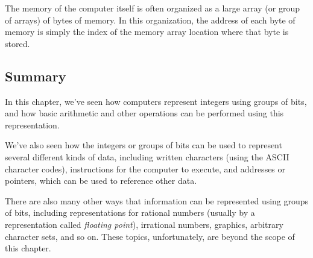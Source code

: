 The memory of the computer itself is often organized as a large array
(or group of arrays) of bytes of memory.  In this organization, the
address of each byte of memory is simply the index of the memory array
location where that byte is stored.


\subsection{Summary}

In this chapter, we've seen how computers represent integers
using groups of bits, and how basic arithmetic and other
operations can be performed using this representation.

We've also seen how the integers or groups of bits can be used
to represent several different kinds of data,
including written characters (using the ASCII character codes),
instructions for the computer to execute,
and addresses or pointers, which can be used to reference other data.

There are also many other ways that information can be represented
using groups of bits, including representations for rational
numbers (usually by a representation called {\em floating point}),
irrational numbers, graphics, arbitrary character sets, and
so on.  These topics, unfortunately, are beyond the scope of this
chapter.

